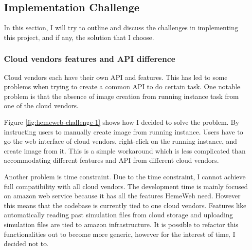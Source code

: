 \subsection{Implementation Challenge}


In this section, I will try to outline and discuss the challenges in implementing this project, and if any, the solution that I choose.

\subsubsection{Cloud vendors features and API difference}

Cloud vendors each have their own API and features. This has led to some problems when trying to create a common API to do certain task. One notable problem is that the absence of image creation from running instance task from one of the cloud vendors.

\vspace{1cm}

\noindent%
\begin{minipage}{\linewidth}%
\label{fig:hemeweb-challenge-1}%
\end{minipage}

\vspace{1cm}

Figure \ref{fig:hemeweb-challenge-1} shows how I decided to solve the problem. By instructing users to manually create image from running instance. Users have to go the web interface of cloud vendors, right-click on the running instance, and create image from it. This is a simple workaround which is less complicated than accommodating different features and API from different cloud vendors. 


Another problem is time constraint. Due to the time constraint, I cannot achieve full compatibility with all cloud vendors. The development time is mainly focused on amazon web service because it has all the features HemeWeb need. However this means that the codebase is currently tied to one cloud vendors. Features like automatically reading past simulation files from cloud storage and uploading simulation files are tied to amazon infrastructure. It is possible to refactor this functionalities out to become more generic, however for the interest of time, I decided not to.

